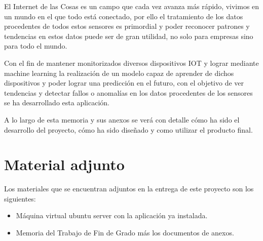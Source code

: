 

El Internet de las Cosas es un campo que cada vez avanza más rápido, vivimos en un mundo en el que todo está conectado, por ello el tratamiento de los datos procedentes de todos estos sensores es primordial y poder reconocer patrones y tendencias en estos datos puede ser de gran utilidad, no solo para empresas sino para todo el mundo.

Con el fin de mantener monitorizados diversos dispositivos IOT y lograr mediante machine learning la realización de un modelo capaz de aprender de dichos dispositivos y poder lograr una predicción en el futuro, con el objetivo de ver tendencias y detectar fallos o anomalías en los datos procedentes de los sensores se ha desarrollado esta aplicación.

A lo largo de esta memoria y sus anexos se verá con detalle cómo ha sido el desarrollo del proyecto, cómo ha sido diseñado y como utilizar el producto final. 

\section{Material adjunto}
Los materiales que se encuentran adjuntos en la entrega de este proyecto son los siguientes:
\begin{itemize}
    \item Máquina virtual ubuntu server con la aplicación ya instalada.
    \item Memoria del Trabajo de Fin de Grado más los documentos de anexos.
\end{itemize}
